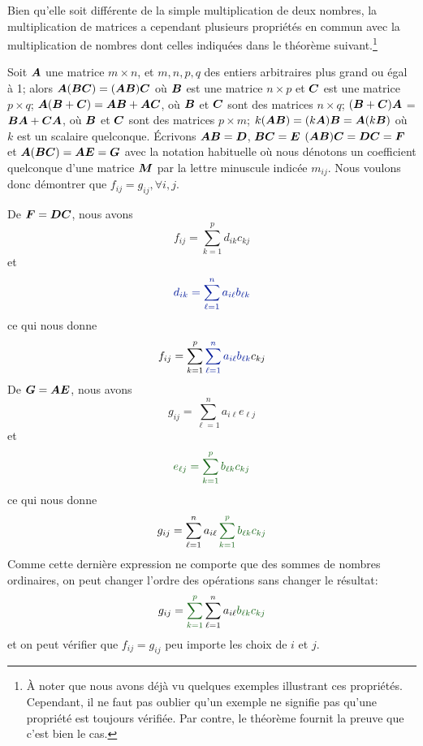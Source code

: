 Bien qu'elle soit différente de la simple multiplication de deux nombres, 
la multiplication de matrices a cependant plusieurs propriétés en commun avec la multiplication de
nombres dont celles indiquées dans le théorème suivant.\footnote{À noter que nous avons déjà
vu quelques exemples illustrant ces propriétés. Cependant, il ne faut pas oublier qu'un exemple
ne signifie pas qu'une propriété est toujours vérifiée.  Par contre, le théorème fournit
la preuve que c'est bien le cas.}


\begin{theo}
Soit $\boldsymbol{A}$ une matrice $m \times n$, et $m, n, p, q$ des entiers arbitraires plus grand ou égal à 1; alors
 $\boldsymbol{A}(\boldsymbol{B}\boldsymbol{C}) = (\boldsymbol{A}\boldsymbol{B})\boldsymbol{C}$ où $\boldsymbol{B}$ est une matrice $n\times p$ et $\boldsymbol{C}$ est une matrice $p\times q$;
 $\boldsymbol{A}(\boldsymbol{B}+\boldsymbol{C}) = \boldsymbol{A}\boldsymbol{B} + \boldsymbol{A}\boldsymbol{C}$, où $\boldsymbol{B}$ et $\boldsymbol{C}$ sont des matrices $n\times q$;
 $(\boldsymbol{B}+\boldsymbol{C})\boldsymbol{A}$ = $\boldsymbol{B}\boldsymbol{A} + \boldsymbol{C}\boldsymbol{A}$, où $\boldsymbol{B}$ et $\boldsymbol{C}$ sont des matrices $p\times m$;
 $k(\boldsymbol{A}\boldsymbol{B}) = (k\boldsymbol{A})\boldsymbol{B} = \boldsymbol{A}(k\boldsymbol{B})$ où $k$ est un scalaire quelconque.
\proof
{} Écrivons $\boldsymbol{A}\boldsymbol{B}=\boldsymbol{D}$, $\boldsymbol{B}\boldsymbol{C} = \boldsymbol{E}$  $(\boldsymbol{A}\boldsymbol{B})\boldsymbol{C} = \boldsymbol{D}\boldsymbol{C} = \boldsymbol{F}$ et $\boldsymbol{A}(\boldsymbol{B}\boldsymbol{C}) = \boldsymbol{A}\boldsymbol{\boldsymbol{E}} =\boldsymbol{G}$ avec la notation habituelle
où nous dénotons un coefficient quelconque d'une matrice $\boldsymbol{M}$ par la lettre minuscule indicée $m_{ij}$.
Nous voulons donc démontrer que $f_{ij} = g_{ij}, \forall i, j$.

De $\boldsymbol{F} = \boldsymbol{D}\boldsymbol{C}$, nous avons
\[
f_{ij} = \sum_{k=1}^p d_{ik} c_{kj}
\]
et
\[
\color{ExerciceCouleur} d_{ik} = \sum_{\ell=1}^n a_{i\ell} b_{\ell k}
\]
ce qui nous donne
\[
f_{ij} = \sum_{k=1}^p {\color{ExerciceCouleur} \sum_{\ell=1}^n a_{i\ell} b_{\ell k} } c_{kj}
\]
De $\boldsymbol{G} = \boldsymbol{A}\boldsymbol{\boldsymbol{E}}$, nous avons
\[
g_{ij} = \sum_{\ell=1}^n a_{i\ell} e_{\ell j}
\]
et
\[
\color{ExempleCouleur} e_{\ell j} = \sum_{k=1}^p b_{\ell k} c_{kj}
\]
ce qui nous donne
\[
g_{ij} = \sum_{\ell=1}^n a_{i\ell} \color{ExempleCouleur}\sum_{k=1}^p b_{\ell k} c_{kj}
\]
Comme cette dernière expression ne comporte que des
sommes de nombres ordinaires, on peut changer l'ordre
des opérations sans changer le résultat:
\[
g_{ij} = {\color{ExempleCouleur}\sum_{k=1}^p} \sum_{\ell=1}^n a_{i\ell}  {\color{ExempleCouleur} b_{\ell k} c_{kj}}
\]
et on peut vérifier que $f_{ij}=g_{ij}$ peu importe les choix de $i$ et $j$. \cqfd


\end{theo}
